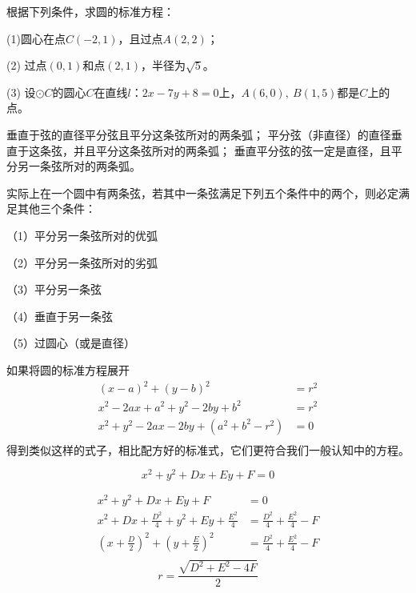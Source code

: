 \begin{example}
    根据下列条件，求圆的标准方程：

   (1)圆心在点$C(-2,1)$，且过点$A(2,2)$；

   (2) 过点$(0,1)$和点$(2,1)$，半径为\(\sqrt{5}\)。

   (3) 设\(\odot C\)的圆心$C$在直线$l$：$2x-7y+8=0$上，$A(6,0),\ B(1,5)$都是$C$上的点。
\end{example}
\begin{theorem}[垂径定理]
    垂直于弦的直径平分弦且平分这条弦所对的两条弧；
    平分弦（非直径）的直径垂直于这条弦，并且平分这条弦所对的两条弧；
    垂直平分弦的弦一定是直径，且平分另一条弦所对的两条弧。

    实际上在一个圆中有两条弦，若其中一条弦满足下列五个条件中的两个，则必定满足其他三个条件：

    （1）平分另一条弦所对的优弧
    
    （2）平分另一条弦所对的劣弧
    
    （3）平分另一条弦
    
    （4）垂直于另一条弦
    
    （5）过圆心（或是直径）

\end{theorem}
如果将圆的标准方程展开
\begin{align*}
    (x-a)^2+(y-b)^2&=r^2\\
    x^2-2ax+a^2+y^2-2by+b^2&=r^2\\
    x^2+y^2-2ax-2by+(a^2+b^2-r^2)&=0\\
\end{align*}
得到类似这样的式子，相比配方好的标准式，它们更符合我们一般认知中的方程。
\begin{theorem}[圆的一般方程]
    \begin{equation}
        x^2+y^2+Dx+Ey+F=0
    \end{equation}
\end{theorem}
\begin{jie}
    \begin{align*}
        x^2+y^2+Dx+Ey+F&=0\\
        x^2+Dx+\frac{D^2}{4}+y^2+Ey+\frac{E^2}{4}&=\frac{D^2}{4}+\frac{E^2}{4}-F\\
        (x+\frac{D}{2})^2+(y+\frac{E}{2})^2&=\frac{D^2}{4}+\frac{E^2}{4}-F\\
    \end{align*}
    \[r=\frac{\sqrt{D^2+E^2-4F}}{2}\]
\end{jie}

